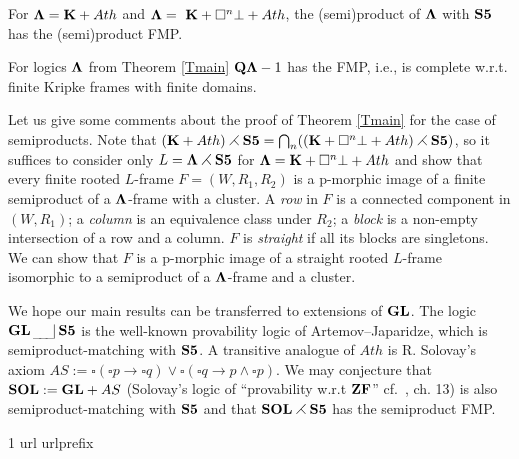 \documentclass[twoside]{aiml20}
\def\BF{{\bf F}}
\def\BZ{{\bf Z}}
\def\ri{\rightarrow}
\def\BK{{\bf K}}
\def\BQ{{\bf Q}}
\def\sqr{\square}
\def\bLa{{\bf \Lambda}}
\def\we{\wedge}
\def\sem0{\,_{\_\!\_\!\_}\!|\,}
\def\sem{\,_{\_\!\_\!\_}\!|\,\bS5}
\def\rtt{\rightthreetimes}
\def\bGL{{\bf GL}}
\def\bLa{{\bf \Lambda}}
\def\bS5{{\bf S5}}
\def\ri{\rightarrow}
\def\sqr{\square}
\def\we{\wedge}
\begin{document}
{\begin{theorem}\label{Tmain} 
  For $\bLa= \BK+Ath$ and $\bLa=~\BK+\sqr^n\bot+Ath$, the
  (semi)product of $\bLa$ with $\bS5$ has the (semi)product FMP.
\end{theorem}

\begin{corollary}
  For logics $\bLa$ from Theorem \ref{Tmain} $\BQ\bLa-1$ has the FMP,
  i.e., is complete w.r.t. finite Kripke frames with finite domains.
\end{corollary}


Let us give some comments about the proof of Theorem \ref{Tmain} for
the case of semiproducts. Note that
$(\BK+Ath)\rtt\bS5=\bigcap_n((\BK+\sqr^n\bot+Ath)\rtt\bS5)$, so it
suffices to consider only $L=\bLa\rtt\bS5$ for
$\bLa=\BK+\sqr^n\bot+Ath$ and show that every finite rooted $L$-frame
$F=(W,R_1,R_2)$ is a p-morphic image of a finite semiproduct of a
$\bLa$-frame with a cluster.  A {\em row} in $F$ is a connected
component in $(W,R_1)$; a {\em column} is an equivalence class under
$R_2$; a {\em block} is a non-empty intersection of a row and a
column.  $F$ is {\em straight} if all its blocks are singletons. We
can show that $F$ is a p-morphic image of a straight rooted $L$-frame
isomorphic to a semiproduct of a $\bLa$-frame and a cluster.

\begin{remark}
  We hope our main results can be transferred to extensions of
  ${\bf GL}$. The logic $\bGL\sem$ is the well-known provability logic
  of Artemov--Japaridze, which is semiproduct-matching with $\bS5$. A
  transitive analogue of $Ath$ is R. Solovay's axiom
  $AS:=\sqr(\sqr p\ri\sqr q)\vee\sqr(\sqr q\ri p\we\sqr p)$.  We may
  conjecture that ${\bf SOL}:=\bGL+AS$ (Solovay's logic of
  ``provability w.r.t $\BZ\BF$'' cf.~\cite{Boolos}, ch. 13) is also
  semiproduct-matching with $\bS5$ and that ${\bf SOL}\rtt\bS5$ has
  the semiproduct FMP.
\end{remark}

\begin{thebibliography}{1}
\expandafter\ifx\csname url\endcsname\relax
  \def\url#1{\texttt{#1}}\fi
\expandafter\ifx\csname urlprefix\endcsname\relax\def\urlprefix{URL }\fi
\newcommand{\enquote}[1]{``#1''}


\end{thebibliography}}
\end{document}
